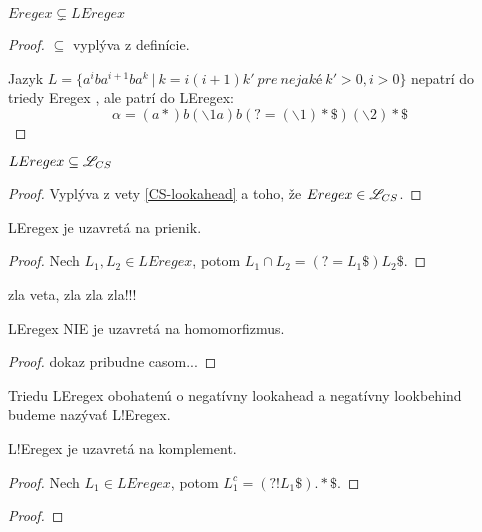 \begin{veta}
$ Eregex \subsetneq LEregex $
\end{veta}
\begin{proof}
$ \subseteq $ vyplýva z definície.

Jazyk $L = \lbrace a^iba^{i+1}ba^k ~|~ k=i(i+1)k' ~ pre ~ nejaké ~ k'>0, i>0 \rbrace$ nepatrí do triedy Eregex \cite[Lemma 2]{ExtendedRegexIntersec}, ale patrí do LEregex:
$$ \alpha = (a*)b(\backslash 1a)b(?=(\backslash 1)* \mathdollar )(\backslash 2)* \mathdollar $$
\end{proof}

\begin{veta}
$ LEregex \subseteq \mathscr{L}_{CS} $
\end{veta}
\begin{proof}
Vyplýva z vety \ref{CS-lookahead} a toho, že $ Eregex \in \mathscr{L}_{CS} $.
\end{proof}

\begin{veta}
LEregex je uzavretá na prienik.
\end{veta}
\begin{proof}
Nech $L_1,L_2 \in LEregex$, potom $L_1 \cap L_2 = \left( ?= L_1 \mathdollar \right) L_2 \mathdollar $.
\end{proof}

\todo zla veta, zla zla zla!!!
\begin{veta}
LEregex NIE je uzavretá na homomorfizmus.
\end{veta}
\begin{proof}
\todo dokaz pribudne casom...
\end{proof}


Triedu LEregex obohatenú o negatívny lookahead a negatívny lookbehind budeme nazývať L!Eregex.

\begin{veta}
L!Eregex je uzavretá na komplement.
\end{veta}
\begin{proof}
Nech $L_1 \in LEregex$, potom $L_1^c  = \left( ?! L_1 \mathdollar \right) .* \mathdollar $.
\end{proof}

\begin{veta}
\end{veta}
\begin{proof}
\end{proof}


